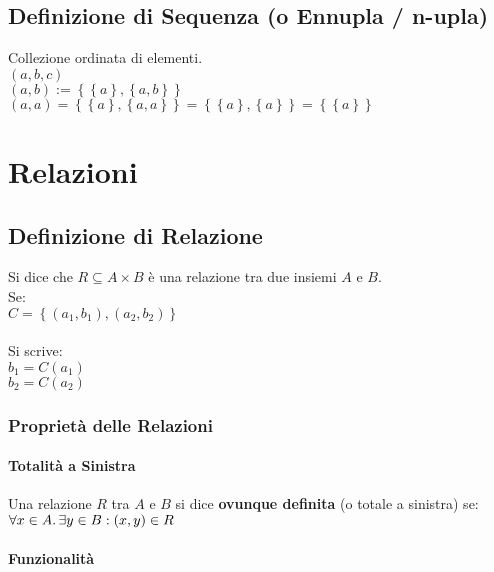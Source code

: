 \documentclass[a4paper, twoside, italian, 11pt]{book}
\newcommand{\braces}[1] {\left\{#1\right\}}
\begin{document}
\section{Definizione di Sequenza (o Ennupla / n-upla)}

Collezione ordinata di elementi. \\

$(a, b, c)$ \\

\noindent
$(a, b) := \braces{\braces{a}, \braces{a, b}}$ \\
$(a, a) = \braces{\braces{a}, \braces{a, a}} = \braces{\braces{a}, \braces{a}} = \braces{\braces{a}}$



\chapter{Relazioni}



\section{Definizione di Relazione}

Si dice che $R \subseteq A \times B$ è una relazione tra due insiemi $A$ e $B$.\\

\noindent
Se: \\
$C = \braces{(a_1, b_1), (a_2, b_2)}$ \\\\
Si scrive:\\
$b_1 = C(a_1)$ \\
$b_2 = C(a_2)$


\subsection{Proprietà delle Relazioni}


\subsubsection{Totalità a Sinistra}

Una relazione $R$ tra $A$ e $B$ si dice \textbf{ovunque definita} (o totale a sinistra) se: \\

$\forall x \in A \ldotp \exists y \in B : (x, y) \in R$


\subsubsection{Funzionalità}
\end{document}

